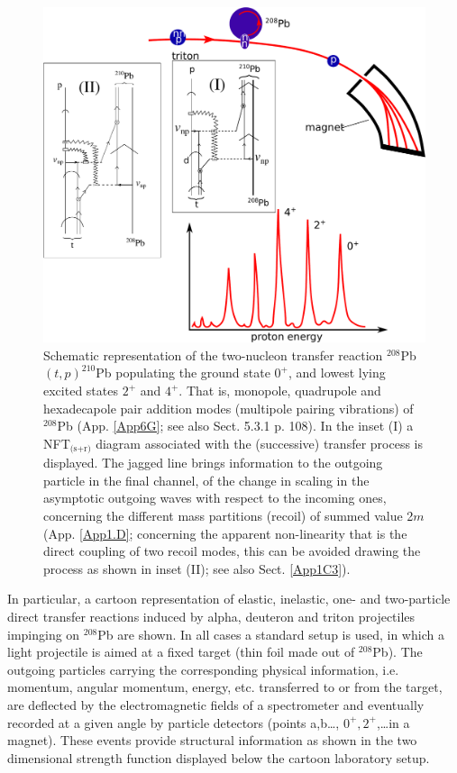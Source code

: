 \begin{figure}
\centerline {
\includegraphics*[width=15cm]{introduccion/figs/figintro3}
}
\caption{Schematic representation of the two-nucleon transfer reaction $^{208}$Pb$(t,p)^{210}$Pb  populating the ground state $0^+$, and lowest lying excited states $2^+$ and $4^+$.  That is, monopole, quadrupole and hexadecapole pair addition modes (multipole pairing vibrations) of $^{208}$Pb   (App. \ref{App6G}; see also \cite{Brink:05} Sect. 5.3.1 p. 108). In the inset (I) a NFT$_{\text{(s+r)}}$ diagram associated with the (successive) transfer process is displayed. The jagged line brings information to the outgoing particle in the final channel, of the change in scaling in the asymptotic outgoing waves with respect to the incoming ones, concerning the different mass partitions (recoil) of summed value 2$m$ (App. \ref{App1.D}; concerning the apparent non-linearity that is the direct coupling of two recoil modes, this can be avoided drawing the process as shown in inset (II); see also Sect. \ref{App1C3}).}
\label{figintro3}
\end{figure}
In particular, a cartoon representation of elastic, inelastic, one- and two-particle direct transfer reactions induced by alpha, deuteron and triton  projectiles impinging on $^{208}$Pb are shown. In all cases a standard setup is used, in which a light projectile is aimed at a fixed target (thin foil made out of $^{208}$Pb). The outgoing particles carrying the corresponding physical information, i.e. momentum, angular momentum, energy, etc. transferred to or from the target, are deflected by the electromagnetic fields of a spectrometer and eventually recorded at a given angle by particle detectors (points a,b\dots, $0^+,2^+$,\dots in a magnet). These events provide structural information as shown in the two dimensional strength function displayed below the cartoon laboratory setup. 

